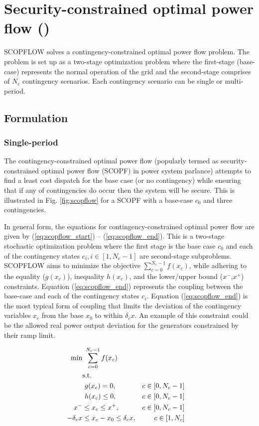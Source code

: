 \chapter{Security-constrained optimal power flow (\scopflow)}\label{chap:scopflow}
SCOPFLOW solves a contingency-constrained optimal power flow problem. The problem is set up as a two-stage optimization problem where the first-stage (base-case) represents the normal operation of the grid and the second-stage comprises of $N_c$ contingency scenarios. Each contingency scenario can be single or multi-period.

\section{Formulation}

\subsection{Single-period}

The contingency-constrained optimal power flow (popularly termed as security-constrained optimal power flow (SCOPF) in power system parlance) attempts to find a least cost dispatch for the base case (or no contingency) while ensuring that if any of contingencies do occur then the system will be secure. This is illustrated in Fig. \ref{fig:scopflow} for a SCOPF with a base-case $c_0$ and three contingencies.




In general form, the equations for contingency-constrained optimal power flow are given by
(\ref{eq:scopflow_start}) -- (\ref{eq:scopflow_end}). This is a two-stage stochastic optimization problem where the first stage is the base case $c_0$ and each of the contingency states $c_i, i \in [1,N_c-1]$ are second-stage subproblems. SCOPFLOW aims to minimize the objective $\sum_{c=0}^{N_c-1}f(x_c)$, while adhering to the equality ($g(x_c)$), inequality $h(x_c)$, and the lower/upper bound ($x^-$,$x^+$) constraints. Equation (\ref{eq:scopflow_end}) represents the coupling between the base-case and each of the contingency states $c_i$. Equation (\ref{eq:scopflow_end}) is the most typical form of coupling that limits the deviation of the contingency variables $x_c$ from the base $x_0$ to within $\delta_c{x}$. An example of this constraint could be the allowed real power output deviation for the generators constrained by their ramp limit.


\begin{align}
\centering
\text{min}&~\sum_{c=0}^{N_c-1}f(x_c)&  \label{eq:scopflow_start}\\
&\text{s.t.}& \nonumber \\
&~g(x_c) = 0,                             &c \in \left[0,N_c-1\right]& \\
&~h(x_c) \le 0,                           &c \in \left[0,N_c-1\right]& \\
x^- & \le x_c \le x^+,                     &c\in \left[0,N_c-1\right]& \\
-\delta_c{x} & \le x_c - x_0 \le \delta_c{x},&c \in \left[1,N_c\right]&
\label{eq:scopflow_end}
\end{align}


